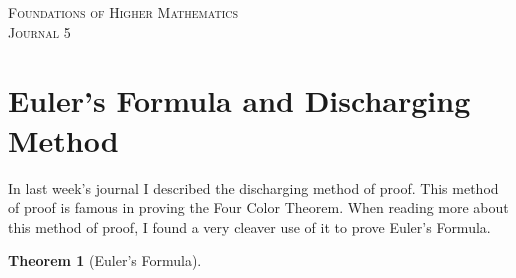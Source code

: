 \documentclass{article}
\newtheorem*{thm}{Theorem}
\begin{document}

\begin{center}
\textsc{\Large Foundations of Higher Mathematics}\\[.3cm]
\textsc{\Large Journal 5}\\[1cm]
\end{center}


\section*{Euler's Formula and Discharging Method}
In last week's journal I described the discharging method of proof. This method of proof is famous in proving the Four Color Theorem. When reading more about this method of proof, I found a very cleaver use of it to prove Euler's Formula. 

\begin{thm}[Euler's Formula]

\end{thm}
\end{document}
